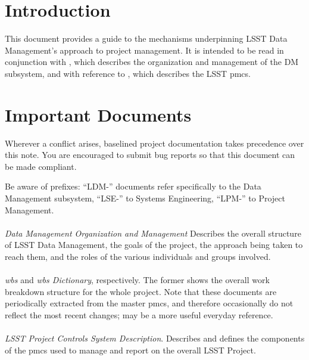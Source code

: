 \section{Introduction}

This document provides a guide to the mechanisms underpinning LSST Data Management's approach to project management.
It is intended to be read in conjunction with , which describes the organization and management of the DM subsystem, and with reference to , which describes the LSST \gls{pmcs}.

\section{Important Documents}
\label{sec:documents}

Wherever a conflict arises, baselined project documentation takes precedence over this note.
You are encouraged to submit bug reports so that this document can be made compliant.

Be aware of prefixes: ``LDM-'' documents refer specifically to the Data Management subsystem, ``LSE-'' to Systems Engineering, ``LPM-'' to Project Management.

\paragraph*{}
\emph{Data Management Organization and Management}
Describes the overall structure of LSST Data Management, the goals of the project, the approach being taken to reach them, and the roles of the various individuals and groups involved.

\paragraph*{}
\emph{\gls{wbs}} and \emph{\gls{wbs} Dictionary}, respectively.
The former shows the overall work breakdown structure for the whole project.
Note that these documents are periodically extracted from the master \gls{pmcs}, and therefore occasionally do not reflect the most recent changes;  may be a more useful everyday reference.

\paragraph*{}
\emph{LSST Project Controls System Description}.
Describes and defines the components of the \gls{pmcs} used to manage and report on the overall LSST Project.

